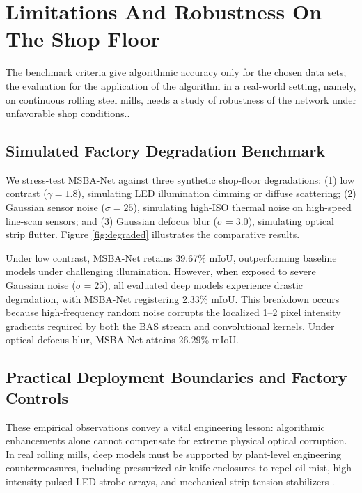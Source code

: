 \documentclass{ieeeaccess}
\begin{document}
\section{Limitations And Robustness On The Shop Floor}
\label{sec:limitations_and_robustness} 
The benchmark criteria give algorithmic accuracy only for the chosen data sets; the evaluation for the application of the algorithm in a real-world setting, namely, on continuous rolling steel mills, needs a study of robustness of the network under unfavorable shop conditions.\cite{neu_benchmark2025, ispad2025}.

\subsection{Simulated Factory Degradation Benchmark}
We stress-test MSBA-Net against three synthetic shop-floor degradations: (1) low contrast ($\gamma = 1.8$), simulating LED illumination dimming or diffuse scattering; (2) Gaussian sensor noise ($\sigma = 25$), simulating high-ISO thermal noise on high-speed line-scan sensors; and (3) Gaussian defocus blur ($\sigma = 3.0$), simulating optical strip flutter. Figure \ref{fig:degraded} illustrates the comparative results.

Under low contrast, MSBA-Net retains 39.67\% mIoU, outperforming baseline models under challenging illumination. However, when exposed to severe Gaussian noise ($\sigma = 25$), all evaluated deep models experience drastic degradation, with MSBA-Net registering 2.33\% mIoU. This breakdown occurs because high-frequency random noise corrupts the localized 1--2 pixel intensity gradients required by both the BAS stream and convolutional kernels. Under optical defocus blur, MSBA-Net attains 26.29\% mIoU.

\subsection{Practical Deployment Boundaries and Factory Controls}
These empirical observations convey a vital engineering lesson: algorithmic enhancements alone cannot compensate for extreme physical optical corruption. In real rolling mills, deep models must be supported by plant-level engineering countermeasures, including pressurized air-knife enclosures to repel oil mist, high-intensity pulsed LED strobe arrays, and mechanical strip tension stabilizers \cite{edge_manufacturing2025}.
\end{document}

